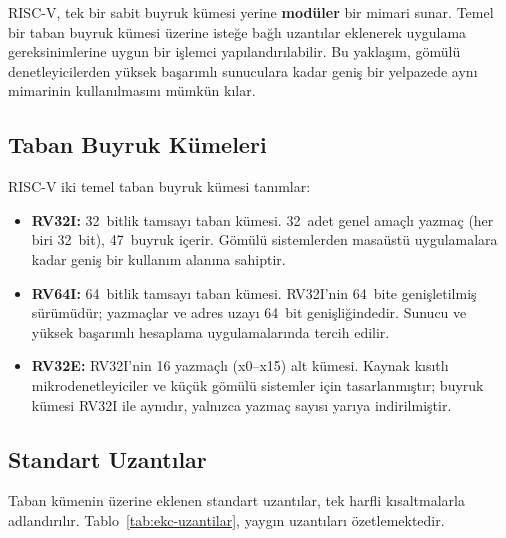 RISC-V, tek bir sabit buyruk kümesi yerine \textbf{modüler} bir mimari sunar. Temel bir taban buyruk kümesi üzerine isteğe bağlı uzantılar eklenerek uygulama gereksinimlerine uygun bir işlemci yapılandırılabilir. Bu yaklaşım, gömülü denetleyicilerden yüksek başarımlı sunuculara kadar geniş bir yelpazede aynı mimarinin kullanılmasını mümkün kılar.

\subsection{Taban Buyruk Kümeleri}

RISC-V iki temel taban buyruk kümesi tanımlar:

\begin{itemize}
    \item \textbf{RV32I:} 32~bitlik tamsayı taban kümesi. 32~adet genel amaçlı yazmaç (her biri 32~bit), 47~buyruk içerir. Gömülü sistemlerden masaüstü uygulamalara kadar geniş bir kullanım alanına sahiptir.
    \item \textbf{RV64I:} 64~bitlik tamsayı taban kümesi. RV32I'nin 64~bite genişletilmiş sürümüdür; yazmaçlar ve adres uzayı 64~bit genişliğindedir. Sunucu ve yüksek başarımlı hesaplama uygulamalarında tercih edilir.
    \item \textbf{RV32E:} RV32I'nin 16 yazmaçlı (x0--x15) alt kümesi. Kaynak kısıtlı mikrodenetleyiciler ve küçük gömülü sistemler için tasarlanmıştır; buyruk kümesi RV32I ile aynıdır, yalnızca yazmaç sayısı yarıya indirilmiştir.
\end{itemize}

\subsection{Standart Uzantılar}

Taban kümenin üzerine eklenen standart uzantılar, tek harfli kısaltmalarla adlandırılır. Tablo~\ref{tab:ekc-uzantilar}, yaygın uzantıları özetlemektedir.

